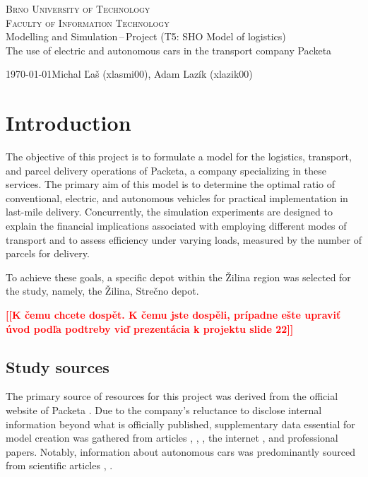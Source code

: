 \documentclass[a4paper, 11pt, a4paper]{article}
\newcommand{\todo}[1]{\textcolor{red}{\textbf{[[#1]]}}}
\begin{document}
\begin{titlepage}
    \begin{center}
            \textsc{\Huge Brno University of Technology \\}
            \vspace{0.5em}
            \textsc{\huge Faculty of Information Technology \\}
            {\LARGE 	Modelling and Simulation\,--\,Project (T5: SHO Model of logistics) \\
            \vspace{0.4em}
            \Huge The use of electric and autonomous cars in the transport company Packeta}
    \end{center}
    {\Large \today \hfill Michal Ľaš (xlasmi00), Adam Lazík (xlazik00)}
\end{titlepage}

\tableofcontents
\newpage

\section{Introduction}

The objective of this project is to formulate a model for the logistics, transport, and parcel delivery operations of Packeta,
a company specializing in these services. The primary aim of this model is to determine the optimal ratio of conventional, electric,
and autonomous vehicles for practical implementation in last-mile delivery. Concurrently, the simulation experiments are designed to
explain the financial implications associated with employing different modes of transport and to assess efficiency under varying loads,
measured by the number of parcels for delivery.

To achieve these goals, a specific depot within the Žilina region was selected for the study, namely, the Žilina, Strečno depot.

\noindent\todo{K čemu chcete dospět. K čemu jste dospěli, prípadne ešte upraviť úvod podľa podtreby viď prezentácia k projektu slide 22}


\subsection{Study sources}

The primary source of resources for this project was derived from the official website of Packeta \cite{packeta}.
Due to the company's reluctance to disclose internal information beyond what is officially published,
supplementary data essential for model creation was gathered from articles \cite{delivery.distance}, \cite{delivery.percentage},
\cite{parcels.num}, the internet \cite{peugeot}, and professional papers.
Notably, information about autonomous cars was predominantly sourced from scientific articles \cite{autonomous.emissions}, \cite{autonomous.models}.
\end{document}
